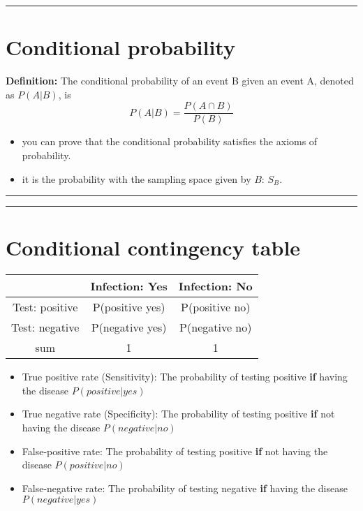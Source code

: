 \documentclass[
]{book}
\providecommand{\tightlist}{%
  \setlength{\itemsep}{0pt}\setlength{\parskip}{0pt}}
\begin{document}
\begin{center}\rule{0.5\linewidth}{0.5pt}\end{center}

\hypertarget{conditional-probability-2}{%
\section{Conditional probability}\label{conditional-probability-2}}

\textbf{Definition:}
The conditional probability of an event B given an event A, denoted as \(P(A|B)\), is
\[P(A|B) = \frac{P(A\cap B)}{P(B)}\]

\begin{itemize}
\tightlist
\item
  you can prove that the conditional probability satisfies the axioms of probability.
\item
  it is the probability with the sampling space given by \(B\): \(S_B\).
\end{itemize}

\begin{center}\rule{0.5\linewidth}{0.5pt}\end{center}

\begin{center}\rule{0.5\linewidth}{0.5pt}\end{center}

\hypertarget{conditional-contingency-table}{%
\section{Conditional contingency table}\label{conditional-contingency-table}}

\begin{longtable}[]{@{}ccc@{}}
\toprule
& Infection: Yes & Infection: No \\
\midrule
\endhead
Test: positive & P(positive {\textbar{}} yes) & P(positive {\textbar{}} no) \\
Test: negative & P(negative {\textbar{}} yes) & P(negative {\textbar{}} no) \\
sum & 1 & 1 \\
\bottomrule
\end{longtable}

\begin{itemize}
\item
  True positive rate (Sensitivity): The probability of testing positive \textbf{if} having the disease \(P(positive|yes)\)
\item
  True negative rate (Specificity): The probability of testing positive \textbf{if} not having the disease \(P(negative|no)\)
\item
  False-positive rate: The probability of testing positive \textbf{if} not having the disease \(P(positive|no)\)
\item
  False-negative rate: The probability of testing negative \textbf{if} having the disease \(P(negative|yes)\)
\end{itemize}
\end{document}
